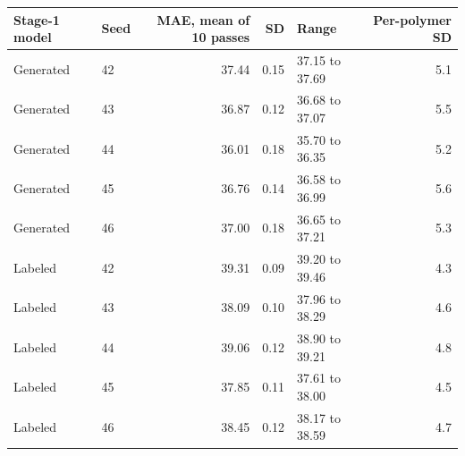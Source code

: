 \begin{tabular}{@{}llrrlr@{}}
\toprule
Stage-1 model & Seed & MAE, mean of 10 passes & SD & Range & Per-polymer SD \\
\midrule
Generated & 42 & 37.44 & 0.15 & 37.15 to 37.69 & 5.1 \\
Generated & 43 & 36.87 & 0.12 & 36.68 to 37.07 & 5.5 \\
Generated & 44 & 36.01 & 0.18 & 35.70 to 36.35 & 5.2 \\
Generated & 45 & 36.76 & 0.14 & 36.58 to 36.99 & 5.6 \\
Generated & 46 & 37.00 & 0.18 & 36.65 to 37.21 & 5.3 \\
Labeled & 42 & 39.31 & 0.09 & 39.20 to 39.46 & 4.3 \\
Labeled & 43 & 38.09 & 0.10 & 37.96 to 38.29 & 4.6 \\
Labeled & 44 & 39.06 & 0.12 & 38.90 to 39.21 & 4.8 \\
Labeled & 45 & 37.85 & 0.11 & 37.61 to 38.00 & 4.5 \\
Labeled & 46 & 38.45 & 0.12 & 38.17 to 38.59 & 4.7 \\
\bottomrule
\end{tabular}
